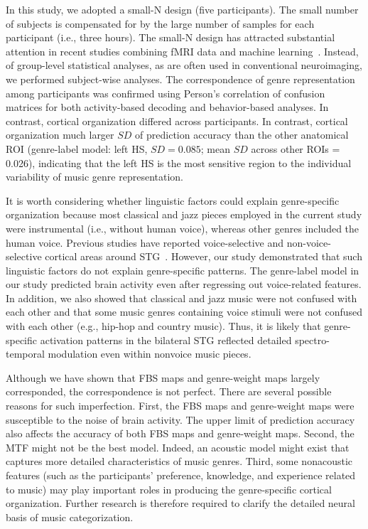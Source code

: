 \documentclass[journal]{IEEEtran}
\begin{document}
In this study, we adopted a small-N design (five participants).
The small number of subjects is compensated for by the large number of samples for each participant (i.e., three hours).
The small-N design has attracted substantial attention in recent studies combining fMRI data and machine learning~\cite{smith2018small}.
Instead, of group-level statistical analyses, as are often used in conventional neuroimaging, we performed subject-wise analyses.
The correspondence of genre representation among participants was confirmed using Person's correlation of confusion matrices for both activity-based decoding and behavior-based analyses.
In contrast, cortical organization differed across participants.
In contrast, cortical organization much larger $ SD $ of prediction accuracy than the other anatomical ROI (genre-label model: left HS, $ SD = 0.085 $; mean $ SD $ across other ROIs = 0.026), indicating that the left HS is the most sensitive region to the individual variability of music genre representation.

It is worth considering whether linguistic factors could explain genre-specific organization because most classical and jazz pieces employed in the current study were instrumental (i.e., without human voice), whereas other genres included the human voice.
Previous studies have reported voice-selective and non-voice-selective cortical areas around STG~\cite{kell2018task,leaver2010cortical,norman2015distinct}.
However, our study demonstrated that such linguistic factors do not explain genre-specific patterns.
The genre-label model in our study predicted brain activity even after regressing out voice-related features.
In addition, we also showed that classical and jazz music were not confused with each other and that some music genres containing voice stimuli were not confused with each other (e.g., hip-hop and country music).
Thus, it is likely that genre-specific activation patterns in the bilateral STG reflected detailed spectro-temporal modulation even within nonvoice music pieces.


Although we have shown that FBS maps and genre-weight maps largely corresponded, the correspondence is not perfect.
There are several possible reasons for such imperfection.
First, the FBS maps and genre-weight maps were susceptible to the noise of brain activity.
The upper limit of prediction accuracy also affects the accuracy of both FBS maps and genre-weight maps.
Second, the MTF might not be the best model.
Indeed, an acoustic model might exist that captures more detailed characteristics of music genres.
Third, some nonacoustic features (such as the participants' preference, knowledge, and experience related to music) may play important roles in producing the genre-specific cortical organization.
Further research is therefore required to clarify the detailed neural basis of music categorization.
\end{document}
